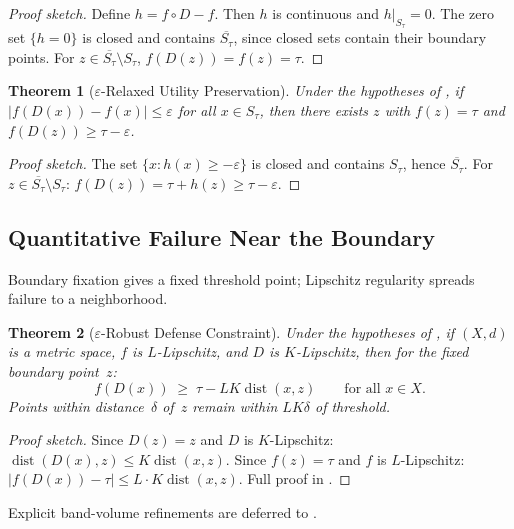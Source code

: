 \documentclass[11pt]{article}
\newtheorem{theorem}{Theorem}[section]
\newcommand{\cl}[1]{\overline{#1}}
\newcommand{\dist}{\operatorname{dist}}
\begin{document}
\begin{proof}[Proof sketch]
Define $h = f \circ D - f$. Then $h$ is continuous and $h|_{S_\tau} = 0$.
The zero set $\{h = 0\}$ is closed and contains $\cl{S_\tau}$, since closed sets contain their boundary points. For
$z \in \cl{S_\tau} \setminus S_\tau$, $f(D(z)) = f(z) = \tau$.
\end{proof}

\begin{theorem}[$\varepsilon$-Relaxed Utility Preservation]
\label{thm:eps-relaxed}
Under the hypotheses of , if
$|f(D(x)) - f(x)| \leq \varepsilon$ for all $x \in S_\tau$, then
there exists $z$ with $f(z) = \tau$ and
$f(D(z)) \geq \tau - \varepsilon$.
\end{theorem}

\begin{proof}[Proof sketch]
The set $\{x : h(x) \geq -\varepsilon\}$ is closed and contains
$S_\tau$, hence $\cl{S_\tau}$. For
$z \in \cl{S_\tau} \setminus S_\tau$:
$f(D(z)) = \tau + h(z) \geq \tau - \varepsilon$.
\end{proof}

\subsection{Quantitative Failure Near the Boundary}
\label{sec:eps-robust}

Boundary fixation gives a fixed threshold point; Lipschitz regularity
spreads failure to a neighborhood.

\begin{theorem}[$\varepsilon$-Robust Defense Constraint]
\label{thm:eps-robust}
Under the hypotheses of , if $(X,d)$ is a metric
space, $f$ is $L$-Lipschitz, and $D$ is $K$-Lipschitz, then for
the fixed boundary point~$z$:
\begin{equation}
  f(D(x)) \;\geq\; \tau - LK\dist(x, z)
  \qquad \text{for all } x \in X.
\end{equation}
Points within distance~$\delta$ of~$z$ remain within
$LK\delta$ of threshold.
\end{theorem}

\begin{proof}[Proof sketch]
Since $D(z)=z$ and $D$ is $K$-Lipschitz:
$\dist(D(x),z) \leq K\dist(x,z)$. Since $f(z)=\tau$ and $f$ is
$L$-Lipschitz:
$|f(D(x)) - \tau| \leq L \cdot K\dist(x,z)$.
Full proof in .
\end{proof}

Explicit band-volume refinements are deferred to .
\end{document}
